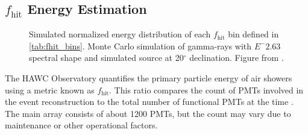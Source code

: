 \subsection{$f_\mathrm{hit}$ Energy Estimation}\label{sec:hawc_fhit}

\begin{figure}
    \caption{Simulated normalized energy distribution of each $f_\mathrm{hit}$ bin defined in \cref{tab:fhit_bins}. Monte Carlo simulation of gamma-rays with $E^-{2.63}$ spectral shape and simulated source at 20$^\circ$ declination. Figure from \cite{Abeysekara_2017}.}
    \label{fig:fhit_bins}
\end{figure}



The HAWC Observatory quantifies the primary particle energy of air showers using a metric known as $f_{\text{hit}}$.
This ratio compares the count of PMTs involved in the event reconstruction to the total number of functional PMTs at the time \cite{Abeysekara_2017}.
The main array consists of about 1200 PMTs, but the count may vary due to maintenance or other operational factors.


